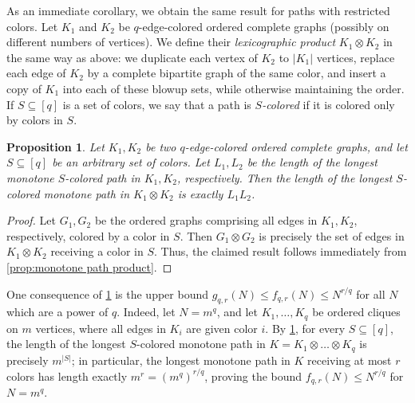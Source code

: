\documentclass[11pt,reqno]{amsart}
\newtheorem{proposition}[theorem]{Proposition}
\theoremstyle{definition}
\newcommand\ab[1]{\lvert#1\rvert}
\newcommand\1{\mathbf{1}}
\let\leq\leqslant
\begin{document}
As an immediate corollary, we obtain the same result for paths with restricted colors.
Let $K_1$ and $K_2$ be $q$-edge-colored ordered complete graphs (possibly on different numbers of vertices). We define their \emph{lexicographic product} $K_1 \otimes K_2$ in the same way as above: we duplicate each vertex of $K_2$ to $\ab{K_1}$ vertices, replace each edge of $K_2$ by a complete bipartite graph of the same color, and insert a copy of $K_1$ into each of these blowup sets, while otherwise maintaining the order. 
If $S\subseteq [q]$ is a set of colors, we say that a path is \emph{$S$-colored} if it is colored only by colors in $S$. 
\begin{proposition}\label{prop:lex product}
    Let $K_1,K_2$ be two $q$-edge-colored ordered complete graphs, and let $S \subseteq[q]$ be an arbitrary set of colors. Let $L_1,L_2$ be the length of the longest monotone $S$-colored path in $K_1,K_2$, respectively. Then the length of the longest $S$-colored monotone path in $K_1 \otimes K_2$ is exactly $L_1 L_2$. 
\end{proposition}
\begin{proof}
    Let $G_1,G_2$ be the ordered graphs comprising all edges in $K_1,K_2$, respectively, colored by a color in $S$. Then $G_1 \otimes G_2$ is precisely the set of edges in $K_1 \otimes K_2$ receiving a color in $S$. Thus, the claimed result follows immediately from \cref{prop:monotone path product}.
\end{proof}
One consequence of \cref{prop:lex product} is the upper bound $g_{q,r}(N) \leq f_{q,r}(N) \leq N^{r/q}$ for all $N$ which are a power of $q$. Indeed, let $N=m^q$, and let $K_1,\dots,K_q$ be ordered cliques on $m$ vertices, where all edges in $K_i$ are given color $i$. By \cref{prop:lex product}, for every $S \subseteq [q]$, the length of the longest $S$-colored monotone path in $K = K_1\otimes \dots \otimes K_q$ is precisely $m^{\ab S}$; in particular, the longest monotone path in $K$ receiving at most $r$ colors has length exactly $m^r = (m^q)^{r/q}$, proving the bound $f_{q,r}(N) \leq N^{r/q}$ for $N=m^q$.
\end{document}
